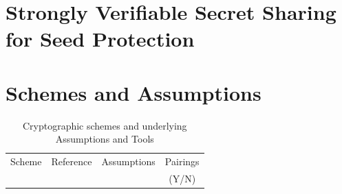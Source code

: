 \documentclass[11pt]{llncs2e/llncs}
\begin{document}
\section{Strongly Verifiable Secret Sharing for Seed Protection}

\section{Schemes and Assumptions}

\begin{table}
\begin{center}
 
 \begin{tabular}{|c|c|c|c|}
 \hline
 Scheme & Reference & Assumptions & Pairings \\
   &&& (Y/N)\\ 
 \hline
 \end{tabular}
\end{center}
\caption{Cryptographic schemes and underlying Assumptions and Tools}
\end{table}
\end{document}
